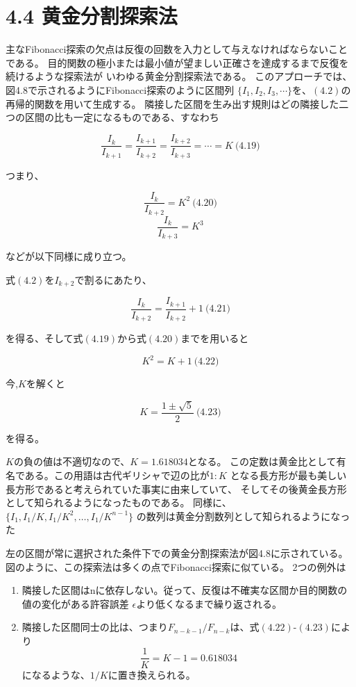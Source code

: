 \section*{4.4 黄金分割探索法}\label{4-4-}

主なFibonacci探索の欠点は反復の回数を入力として与えなければならないことである。
目的関数の極小または最小値が望ましい正確さを達成するまで反復を続けるような探索法が
いわゆる黄金分割探索法である。
このアプローチでは、図4.8で示されるようにFibonacci探索のように区間列
$\lbrace I_1, I_2, I_3 ,
\cdots \rbrace$を、$(4.2)$の再帰的関数を用いて生成する。
隣接した区間を生み出す規則はどの隣接した二つの区間の比も一定になるものである、すなわち

$$\frac{I_k}{I_{k+1}} =
\frac{I_{k+1}}{I_{k+2}} =
\frac{I_{k+2}}{I_{k+3}} = \cdots
= K \ \text{(4.19)}$$

つまり、

$$ \frac{I_k}{I_{k+2}} = K^2
\ \text{(4.20)} $$
$$
\frac{I_k}{I_{k+3}} = K^3 $$

などが以下同様に成り立つ。

式$(4.2)$を$I_{k+2}$で割るにあたり、

$$\frac{I_k}{I_{k+2}} =
\frac{I_{k+1}}{I_{k+2}} + 1 \
\text{(4.21)}$$

を得る、そして式$(4.19)$から式$(4.20)$までを用いると

$$K^2 = K + 1 \ \text{(4.22)}$$

今,$K$を解くと

$$K = \frac{1 \pm
\sqrt{5}}{2} \
\text{(4.23)}$$

を得る。

$K$の負の値は不適切なので、$K = 1.618034$となる。
この定数は黄金比として有名である。この用語は古代ギリシャで辺の比が$1 :
K$
となる長方形が最も美しい長方形であると考えられていた事実に由来していて、
そしてその後黄金長方形として知られるようになったものである。
同様に、$\lbrace I_1, I_1/K , I_1 / K^2 ,
\dots , I_1 / K^{n-1} \rbrace$
の数列は黄金分割数列として知られるようになった
\newpage

左の区間が常に選択された条件下での黄金分割探索法が図4.8に示されている。
図のように、この探索法は多くの点でFibonacci探索に似ている。 2つの例外は

\begin{enumerate}
\tightlist
\item
  隣接した区間はnに依存しない。従って、反復は不確実な区間か目的関数の値の変化がある許容誤差
  $\epsilon$より低くなるまで繰り返される。
\item
  隣接した区間同士の比は、つまり$F_{n-k-1} /
  F_{n-k}$は、式$(4.22)$-$(4.23)$により
  $$\frac{1}{K} = K - 1 = 0.618034$$
  になるような、$1/K$に置き換えられる。
\end{enumerate}

